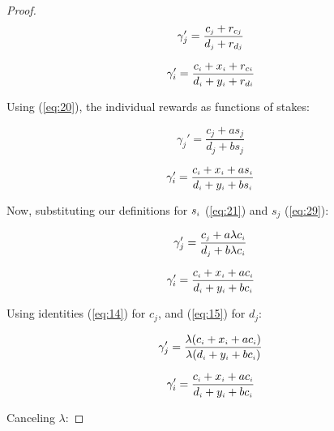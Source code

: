 \documentclass[reqno]{article}
\begin{document}
\begin{proof}
\begin{equation} 
    \gamma_{j}'=\frac{c_\mathsmaller{j}+r_{c\mathsmaller{j}}}{d_\mathsmaller{j}+r_{d\mathsmaller{j}}}
\end{equation}

\begin{equation} 
    \gamma_{i}'=\frac{c_\mathsmaller{i}+x_\mathsmaller{i}+r_{c\mathsmaller{i}}}{d_\mathsmaller{i}+y_\mathsmaller{i}+r_{d\mathsmaller{i}}}
\end{equation}

\bigskip
Using (\ref{eq:20}), the individual rewards as functions of stakes:

\begin{equation} 
    \gamma_{j}'=\frac{c_j+as_j}{d_j+bs_j}
\end{equation}

\begin{equation} 
    \gamma_{i}'=\frac{c_\mathsmaller{i}+x_\mathsmaller{i}+as_\mathsmaller{i}}{d_\mathsmaller{i}+y_\mathsmaller{i}+bs_\mathsmaller{i}}
\end{equation}

\bigskip
Now, substituting our definitions for $s_\mathsmaller{i}$ (\ref{eq:21}) and $s_j$ (\ref{eq:29}):

\begin{equation} 
    \gamma_{j}'=\frac{c_\mathsmaller{j}+a\lambda c_\mathsmaller{i}}{d_\mathsmaller{j}+b\lambda c_\mathsmaller{i}}
\end{equation}

\begin{equation} 
    \gamma_{i}'=\frac{c_\mathsmaller{i}+x_\mathsmaller{i}+ac_\mathsmaller{i}}{d_\mathsmaller{i}+y_\mathsmaller{i}+bc_\mathsmaller{i}}
\end{equation}

\bigskip
Using identities (\ref{eq:14}) for $c_j$, and (\ref{eq:15}) for $d_j$:

\begin{equation} 
    \gamma_{j}'=\frac{\lambda(c_\mathsmaller{i} + x_\mathsmaller{i}+ac_\mathsmaller{i})}{\lambda(d_\mathsmaller{i}+y_\mathsmaller{i}+bc_\mathsmaller{i})}
\end{equation}

\begin{equation} 
    \gamma_{i}'=\frac{c_\mathsmaller{i}+x_\mathsmaller{i}+ac_\mathsmaller{i}}{d_\mathsmaller{i}+y_\mathsmaller{i}+bc_\mathsmaller{i}}
\end{equation}

\bigskip
Canceling $\lambda$:


\end{proof}
\end{document}
